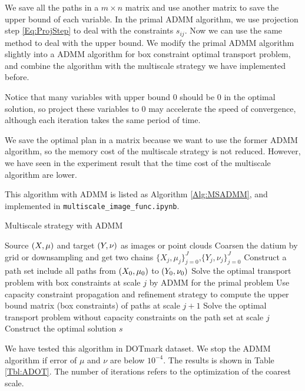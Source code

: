 \documentclass[english]{pkupaper}
\begin{document}
We save all the paths in a $m \times n$ matrix and use another matrix to save the upper bound of each variable. In the primal ADMM algorithm, we use projection step \eqref{Eq:ProjStep} to deal with the constraints $s_{ij}$. Now we can use the same method to deal with the upper bound. We modify the primal ADMM algorithm slightly into a ADMM algorithm for box constraint optimal transport problem, and combine the algorithm with the multiscale strategy we have implemented before.

Notice that many variables with upper bound $0$ should be $0$ in the optimal solution, so project these variables to $0$ may accelerate the speed of convergence, although each iteration takes the same period of time.

We save the optimal plan in a matrix because we want to use the former ADMM algorithm, so the memory cost of the multiscale strategy is not reduced. However, we have seen in the experiment result that the time cost of the multiscale algorithm are lower.

This algorithm with ADMM is listed as Algorithm \ref{Alg:MSADMM}, and implemented in \verb"multiscale_image_func.ipynb".

\begin{algorithm} 
\caption{Multiscale strategy with ADMM} \label{Alg:MSADMM}
\begin{algorithmic}
\REQUIRE Source $ \left(  X, \mu  \right) $ and target $ \left(  Y, \nu  \right) $ as images or point clouds
\STATE Coarsen the datium by grid or downsampling and get two chains $\{ X_j, \mu_j \}^J_{j=0}$,$\{Y_j, \nu_j\}^J_{j=0}$
\STATE Construct a path set include all paths from $\left( X_0, \mu_0 \right)$ to $\left( Y_0, \nu_0 \right)$
\STATE Solve the optimal transport problem with box constraints at scale $j$ by ADMM for the primal problem
\STATE Use capacity constraint propagation and refinement strategy to compute the upper bound matrix (box constraints) of paths at scale $j + 1$
\ENDFOR
\STATE Solve the optimal transport problem without capacity constraints on the path set at scale $j$
\STATE Construct the optimal solution $s$
\end{algorithmic}
\end{algorithm}

We have tested this algorithm in DOTmark dataset. We stop the ADMM algorithm if error of $\mu$ and $\nu$ are below $10^{-4}$. The results is shown in Table \ref{Tbl:ADOT}. The number of iterations refers to the optimization of the coarest scale.
\end{document}
